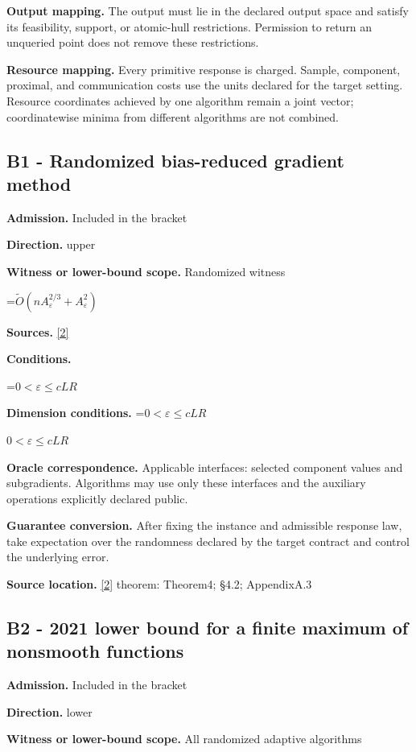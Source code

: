 \documentclass[10pt,a4paper]{article}
\newcommand{\AtlasMath}[1]{\par\begingroup\centering\setbox0=\hbox{$\displaystyle #1$}\ifdim\wd0>1.4\linewidth\typeout{ATLAS WIDE FORMULA: \the\wd0}\fi\ifdim\wd0>\linewidth\resizebox{\linewidth}{!}{\box0}\else\box0\fi\par\endgroup}
\newcommand{\AtlasInlineMath}[1]{\begingroup\setbox0=\hbox{$#1$}\ifdim\wd0>.4\linewidth\endgroup\AtlasMath{#1}\else\endgroup$#1$\fi}
\begin{document}
\textbf{Output mapping.} The output must lie in the declared output space and satisfy its feasibility, support, or atomic-hull restrictions. Permission to return an unqueried point does not remove these restrictions.

\textbf{Resource mapping.} Every primitive response is charged. Sample, component, proximal, and communication costs use the units declared for the target setting. Resource coordinates achieved by one algorithm remain a joint vector; coordinatewise minima from different algorithms are not combined.

\subsection{B1 - Randomized bias-reduced gradient method}
\textbf{Admission.} Included in the bracket

\textbf{Direction.} upper

\textbf{Witness or lower-bound scope.} Randomized witness

\AtlasMath{\widetilde{O}(nA_\varepsilon^{2/3}+A_\varepsilon^2)}
\textbf{Sources.} \href{https://arxiv.org/pdf/2106.09481}{[2]}

\textbf{Conditions.} 
\AtlasMath{0<\varepsilon\le cLR}


\textbf{Dimension conditions.} \AtlasInlineMath{0<\varepsilon\le cLR}

\textbf{Oracle correspondence.} Applicable interfaces: selected component values and subgradients. Algorithms may use only these interfaces and the auxiliary operations explicitly declared public.

\textbf{Guarantee conversion.} After fixing the instance and admissible response law, take expectation over the randomness declared by the target contract and control the underlying error.

\textbf{Source location.} \href{https://arxiv.org/pdf/2106.09481}{[2]} theorem: Theorem4; §4.2; AppendixA.3

\subsection{B2 - 2021 lower bound for a finite maximum of nonsmooth functions}
\textbf{Admission.} Included in the bracket

\textbf{Direction.} lower

\textbf{Witness or lower-bound scope.} All randomized adaptive algorithms
\end{document}
